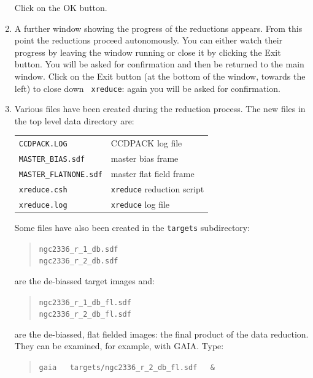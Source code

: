 \documentclass[twoside,11pt]{article}
\begin{document}
\begin{enumerate}
   Click on the {\sf OK} button.

  \item A further window showing the progress of the reductions appears.
   From this point the reductions proceed autonomously.  You can
   either watch their progress by leaving the window running or close it
   by clicking the {\sf Exit} button.  You will be asked for confirmation
   and then be returned to the main window.  Click on the {\sf Exit} button
   (at the bottom of the window, towards the left) to close down {\tt
   xreduce}: again you will be asked for confirmation.

  \item Various files have been created during the reduction process.
   The new files in the top level data directory are:

  \begin{center}
  \begin{tabular}{ll}
   {\tt CCDPACK.LOG}          & CCDPACK log file \\
   {\tt MASTER\_BIAS.sdf}     & master bias frame \\
   {\tt MASTER\_FLATNONE.sdf} & master flat field frame \\
   {\tt xreduce.csh}          & {\tt xreduce} reduction script \\
   {\tt xreduce.log}          & {\tt xreduce} log file \\
  \end{tabular}
  \end{center}

   Some files have also been created in the {\tt targets} subdirectory:

  \begin{quote}
   {\tt ngc2336\_r\_1\_db.sdf \\
   ngc2336\_r\_2\_db.sdf}
  \end{quote}

   are the de-biassed target images and:

  \begin{quote}
   {\tt ngc2336\_r\_1\_db\_fl.sdf \\
   ngc2336\_r\_2\_db\_fl.sdf}
  \end{quote}

   are the de-biassed, flat fielded images: the final product of the
   data reduction.  They can be examined, for example, with GAIA.  Type:
  \begin{quote}
   {\tt gaia ~ targets/ngc2336\_r\_2\_db\_fl.sdf ~ \&}
  \end{quote}


\end{enumerate}
\end{document}
